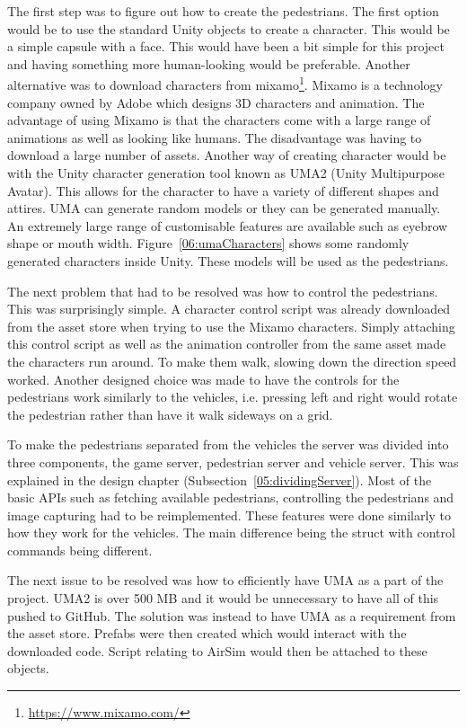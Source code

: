 The first step was to figure out how to create the pedestrians. The first option would be to use the standard Unity objects to create a character. This would be a simple capsule with a face. This would have been a bit simple for this project and having something more human-looking would be preferable. Another alternative was to download characters from mixamo\footnote{\url{ https://www.mixamo.com/}}. Mixamo is a technology company owned by Adobe which designs 3D characters and animation. The advantage of using Mixamo is that the characters come with a large range of animations as well as looking like humans. The disadvantage was having to download a large number of assets. Another way of creating character would be with the Unity character generation tool known as UMA2 (Unity Multipurpose Avatar). This allows for the character to have a variety of different shapes and attires. UMA can generate random models or they can be generated manually. An extremely large range of customisable features are available such as eyebrow shape or mouth width. Figure~\ref{06:umaCharacters} shows some randomly generated characters inside Unity. These models will be used as the pedestrians. 

The next problem that had to be resolved was how to control the pedestrians. This was surprisingly simple. A character control script was already downloaded from the asset store when trying to use the Mixamo characters. Simply attaching this control script as well as the animation controller from the same asset made the characters run around. To make them walk, slowing down the direction speed worked. Another designed choice was made to have the controls for the pedestrians work similarly to the vehicles, i.e. pressing left and right would rotate the pedestrian rather than have it walk sideways on a grid. 

To make the pedestrians separated from the vehicles the server was divided into three components, the game server, pedestrian server and vehicle server. This was explained in the design chapter (Subsection~\ref{05:dividingServer}). Most of the basic APIs such as fetching available pedestrians, controlling the pedestrians and image capturing had to be reimplemented. These features were done similarly to how they work for the vehicles. The main difference being the struct with control commands being different. 

The next issue to be resolved was how to efficiently have UMA as a part of the project. UMA2 is over 500 MB and it would be unnecessary to have all of this pushed to GitHub. The solution was instead to have UMA as a requirement from the asset store. Prefabs were then created which would interact with the downloaded code. Script relating to AirSim would then be attached to these objects. 

